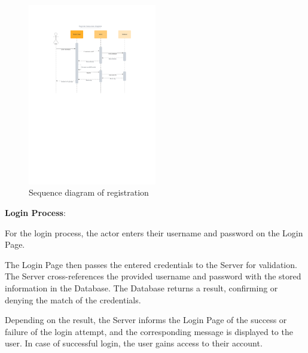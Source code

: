 \documentclass[conference]{IEEEtran}
\begin{document}
\begin{figure}[htbp]
	\centerline{\includegraphics[width=0.5\textwidth]{Diagram_of_Login_and_Register/Sequence_diagram_of_registration.pdf}}
	\caption{Sequence diagram of registration }
	\label{Sequence_diagram_of_registration}
\end{figure}
\textbf{Login Process}:

For the login process, the actor enters their username and password on the Login Page.

The Login Page then passes the entered credentials to the Server for validation.
The Server cross-references the provided username and password with the stored information in the Database. The Database returns a result, confirming or denying the match of the credentials.

Depending on the result, the Server informs the Login Page of the success or failure of the login attempt, and the corresponding message is displayed to the user. In case of successful login, the user gains access to their account.
\end{document}
